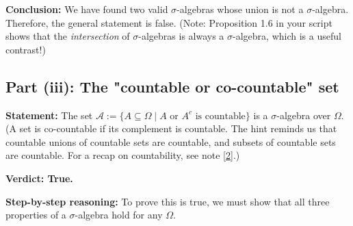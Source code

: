 \documentclass[11pt,a4paper]{article}
\begin{document}
\textbf{Conclusion:} We have found two valid $\sigma$-algebras whose union is not a $\sigma$-algebra. Therefore, the general statement is false.
(Note: Proposition 1.6 in your script shows that the \textit{intersection} of $\sigma$-algebras is always a $\sigma$-algebra, which is a useful contrast!)

\subsection{Part (iii): The "countable or co-countable" set}
\textbf{Statement:} The set $\mathcal{A} := \{A \subseteq \Omega \mid A \text{ or } A^c \text{ is countable}\}$ is a $\sigma$-algebra over $\Omega$.
(A set is co-countable if its complement is countable. The hint reminds us that countable unions of countable sets are countable, and subsets of countable sets are countable. For a recap on countability, see note \hyperlink{note2}{[2]}.)

\textbf{Verdict: True.}

\textbf{Step-by-step reasoning:}
To prove this is true, we must show that all three properties of a $\sigma$-algebra hold for any $\Omega$.
\end{document}
